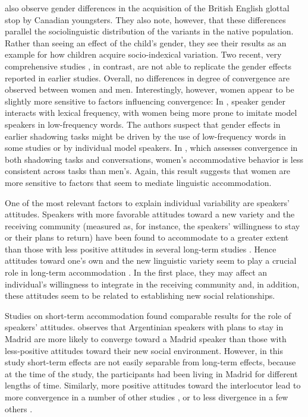 \documentclass[output=paper]{langscibook}
\begin{document}
\textcite{tagliamonte_howd_2007} also observe gender differences in the acquisition of the British English glottal stop by Canadian youngsters. They also note, however, that these differences parallel the sociolinguistic distribution of the variants in the native population. Rather than seeing an effect of the child's gender, they see their results as an example for how children acquire socio-indexical variation. Two recent, very comprehensive studies \parencite{pardo_phonetic_2017,pardo_comparison_2018}, in contrast, are not able to replicate the gender effects reported in earlier studies. Overall, no differences in degree of convergence are observed between women and men. Interestingly, however, women appear to be slightly more sensitive to factors influencing convergence: In \textcite{pardo_phonetic_2017}, speaker gender interacts with lexical frequency, with women being more prone to imitate model speakers in low-frequency words. The authors suspect that gender effects in earlier shadowing tasks might be driven by the use of low-frequency words in some studies or by individual model speakers. In \textcite{pardo_comparison_2018}, which assesses convergence in both shadowing tasks and conversations, women's accommodative behavior is less consistent across tasks than men's. Again, this result suggests that women are more sensitive to factors that seem to mediate linguistic accommodation.

One of the most relevant factors to explain individual variability are speakers' attitudes. Speakers with more favorable attitudes toward a new variety and the receiving community (measured as, for instance, the speakers' willingness to stay or their plans to return) have been found to accommodate to a greater extent than those with less positive attitudes in several long-term studies \citep{VandenBerg1988,werlen_zwischen_2006,pesqueira_cambio_2008,romera_prosodic_2013,Mick2013,reubold_dissociating_2015}. Hence attitudes toward one's own and the new linguistic variety seem to play a crucial role in long-term accommodation \citep[see][]{Caravedo2010}. In the first place, they may affect an individual's willingness to integrate in the receiving community and, in addition, these attitudes seem to be related to establishing new social relationships.

Studies on short-term accommodation found comparable results for the role of speakers' attitudes. \citet{macleod_effect_2012} observes that Argentinian speakers with plans to stay in Madrid are more likely to converge toward a Madrid speaker than those with less-positive attitudes toward their new social environment. However, in this study short-term effects are not easily separable from long-term effects, because at the time of the study, the participants had been living in Madrid for different lengths of time. 
Similarly, more positive attitudes toward the interlocutor lead to more convergence in a number of other studies \citep{babel_dialect_2010,babel_evidence_2012,yu_phonetic_2013,schweitzer_convergence_2013}, or to less divergence in a few others \citep[e.g.][]{schweitzer_social_2014}. 
\end{document}
